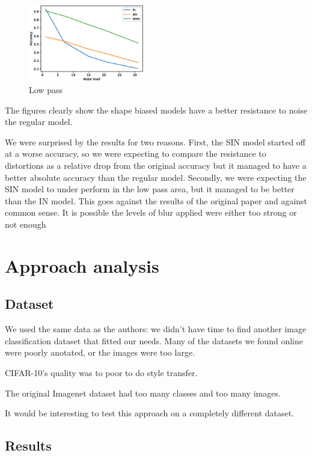 \documentclass{article}
\begin{document}
\begin{figure}[h!]
\centering
\includegraphics[width = 0.45\textwidth]{imgs/low_pass}
\caption{Low pass}
\end{figure}

The figures clearly show the shape biased models have a better resistance to noise the regular model.

We were surprised by the results for two reasons.
First, the SIN model started off at a worse accuracy, so we were expecting to compare the resistance to distortions as a relative drop from the original accuracy but it managed to have a better absolute accuracy than the regular model.
Secondly, we were expecting the SIN model to under perform in the low pass area, but it managed to be better than the IN model. This goes against the results of the original paper and against common sense. It is possible the levels of blur applied were either too strong or not enough


\newpage
\section{Approach analysis}

\subsection{Dataset}

We used the same data as the authors: we didn't have time
to find another image classification dataset that fitted our needs.
Many of the datasets we found online were poorly anotated, or the images
were too large.

CIFAR-10's quality was to poor to do style transfer.

The original Imagenet dataset had too many classes and too many images.

It would be interesting to test this approach on a completely different dataset.

\subsection{Results}
\end{document}
